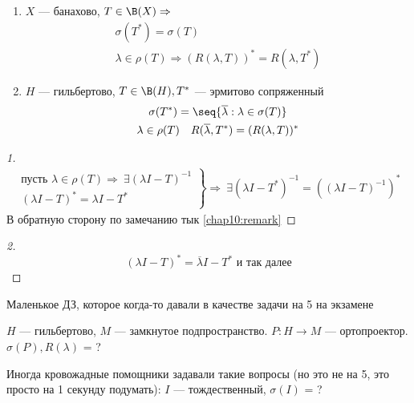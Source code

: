 \documentclass[document]{subfiles}
\begin{document}
\begin{theorem}
    \begin{enumerate}
        \item $X$ --- банахово, $T \in \B(X) \Rightarrow$
            \begin{gather*}
                \sigma(T^*) = \sigma(T) \\
                \lambda \in \rho(T) \Rightarrow (R(\lambda, T))^* = R(\lambda, T^*)
            \end{gather*}
        \item $H$ --- гильбертово, $T \in \B(H), T^*$ --- эрмитово сопряженный 
            \begin{gather*}
                \sigma(T^*) = \seq{\overline{\lambda} : \lambda \in \sigma(T)} \\
                \lambda \in \rho(T) \quad R(\overline{\lambda}, T^*) = (R(\lambda, T))^*
            \end{gather*}
    \end{enumerate}
\end{theorem}

\begin{proof}[1]
    \begin{gather*}
        \left. \begin{matrix}
            \text{пусть } \lambda \in \rho(T) \Rightarrow \: \exists (\lambda I - T)^{-1} \\
            (\lambda I - T)^* = \lambda I - T^*
        \end{matrix} \right\} \Rightarrow \: \exists (\lambda I - T^*)^{-1} = ((\lambda I - T)^{-1})^*
    \end{gather*}
    В обратную сторону по замечанию тык \ref{chap10:remark} %
\end{proof}

\begin{proof}[2]
    \[ (\lambda I - T)^* = \overline{\lambda} I - T^* \text{ и так далее} \]
\end{proof}

Маленькое ДЗ, которое когда-то давали в качестве задачи на 5 на экзамене
\begin{statement}
    $H$  --- гильбертово, $M$ --- замкнутое подпространство. $P : H \rightarrow M$ --- ортопроектор. $\sigma(P), R(\lambda)$ = ?
\end{statement}

Иногда кровожадные помощники задавали такие вопросы (но это не на 5, это просто на 1 секунду подумать): $I$ --- тождественный, $\sigma(I)$ = ?
\end{document}
